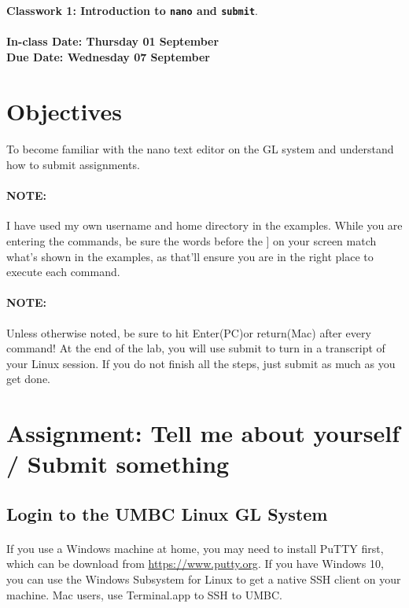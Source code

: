 \documentclass[letter,11pt]{article}
\begin{document}
\huge
\textbf{Classwork 1: Introduction to \texttt{nano} and \texttt{submit}}.
\normalsize
\\ ~~ \\
\textbf{In-class Date: Thursday 01 September} \\
\textbf{Due Date: Wednesday 07 September}

\section*{Objectives}
\paragraph{}To become familiar with the nano text editor on the GL system and understand how to submit assignments.

\paragraph{NOTE:} I have used my own username and home directory in the examples. While you are entering the commands, be sure the words before the ] on your screen match what’s shown in the examples, as that’ll ensure you are in the right place to execute each command.

\paragraph{NOTE:} Unless otherwise noted, be sure to hit Enter(PC)or return(Mac) after every command! At the end of the lab, you will use submit to turn in a transcript of your Linux session. If you do not finish all the steps, just submit as much as you get done.

\section*{Assignment: Tell me about yourself / Submit something}
\subsection{Login to the UMBC Linux GL System}
\paragraph{}If you use a Windows machine at home, you may need to install PuTTY first, which can be download from \url{https://www.putty.org}. If you have Windows 10, you can use the Windows Subsystem for Linux to get a native SSH client on your machine. Mac users, use Terminal.app to SSH to UMBC.
\end{document}
